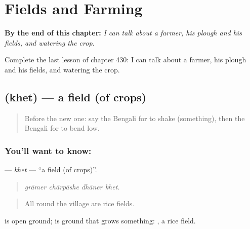 
\chapter{Fields and Farming}
\label{ch:bn-fields-and-farming}

\begin{chapteropening}
\textbf{By the end of this chapter:} \emph{I can talk about a farmer, his plough and his fields, and watering the crop.}

Complete the last lesson of chapter 430: I can talk about a farmer, his plough and his fields, and watering the crop.
\end{chapteropening}

\section[\texorpdfstring{\bn{খেত} (khet)}{খেত (khet)}]{ (khet) — a field (of crops)}

\label{lesson:BN-C430-khet}



\begin{quote}
Before the new one: say the Bengali for to shake (something), then the Bengali for to bend low.
\end{quote}

\subsection*{You'll want to know: }
\textbf{} — \emph{khet} — \textquotedblleft{}a field (of crops)\textquotedblright{}.

\begin{quote}
   
\end{quote}

\begin{quote}
\emph{grāmer chārpāshe dhāner khet.}
\end{quote}

\begin{quote}
All round the village are rice fields.
\end{quote}

 is open ground;  is ground that grows something:  , a rice field.

